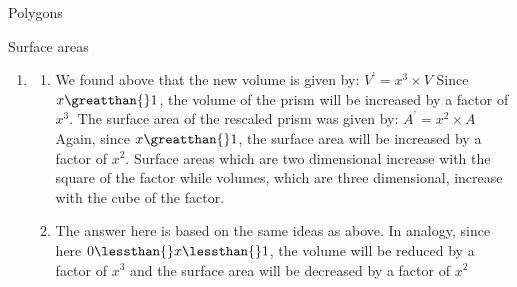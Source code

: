 \begin{exercises}{Polygons}
\begin{exercises}{Surface areas }
{\begin{mdframed}[linewidth=4, leftmargin=40, rightmargin=40]
\begin{exercise}
\begin{enumerate}[noitemsep, label=\textbf{Step} \textbf{\arabic*}. ]
        
        \label{m39357*id64062}The new surface area of the prism will be given by:\par 
        \label{m39357*id64066}\nopagebreak\noindent{}
          
    \begin{equation}
    \begin{array}{ccc}\hfill {A}^{\text{'}}& =& 2\ensuremath{\times}\left({L}^{\text{'}}\ensuremath{\times}{b}^{\text{'}}+{L}^{\text{'}}\ensuremath{\times}{h}^{\text{'}}+{b}^{\text{'}}\ensuremath{\times}{h}^{\text{'}}\right)\hfill \\ & =& 2\ensuremath{\times}\left(x\ensuremath{\times}L\ensuremath{\times}x\ensuremath{\times}b+x\ensuremath{\times}L\ensuremath{\times}x\ensuremath{\times}h+x\ensuremath{\times}b\ensuremath{\times}x\ensuremath{\times}h\right)\hfill \\ & =& {x}^{2}\ensuremath{\times}2\ensuremath{\times}\left(L\ensuremath{\times}b+L\ensuremath{\times}h+b\ensuremath{\times}h\right)\hfill \\ & =& {x}^{2}\ensuremath{\times}A\hfill \end{array}\tag{13.23}
      \end{equation}
    
        
        \item  
        \label{m39357*id64313}\begin{enumerate}[noitemsep, label=\textbf{\alph*}. ] 
            \leftskip=20pt\rightskip=\leftskip\label{m39357*uid23}\item We found above that the new volume is given by:
${V}^{\text{'}}={x}^{3}\ensuremath{\times}V$
Since $x\greatthan{}1$, the volume of the prism will be increased by a factor of ${x}^{3}$.
The surface area of the rescaled prism was given by:
${A}^{\text{'}}={x}^{2}\ensuremath{\times}A$
Again, since $x\greatthan{}1$, the surface area will be increased by a factor of ${x}^{2}$. Surface areas which are two dimensional increase with the square of the factor while volumes, which are three dimensional, increase with the cube of the factor.
\label{m39357*uid24}\item The answer here is based on the same ideas as above.
In analogy, since here $0\lessthan{}x\lessthan{}1$, the volume will be reduced by a factor of ${x}^{3}$ and the surface area will be decreased by a factor of ${x}^{2}$\end{enumerate}
        
        
        \end{enumerate}
         


\end{exercise}
\end{mdframed}}
\end{exercises}
\end{exercises}
